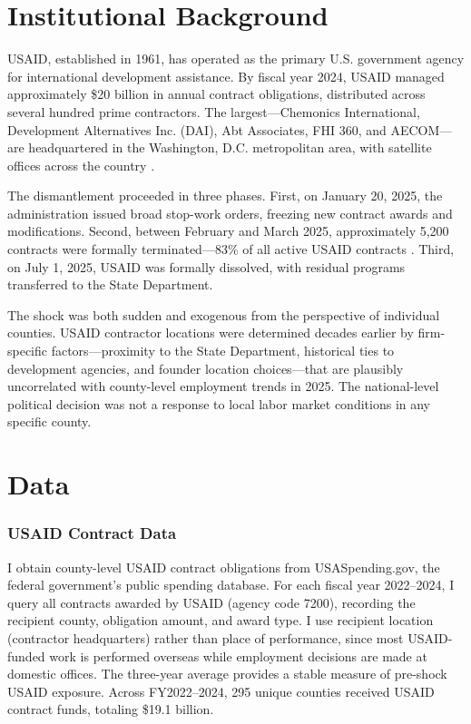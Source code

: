\documentclass[12pt]{article}
\begin{document}
\section{Institutional Background}
\label{sec:background}

USAID, established in 1961, has operated as the primary U.S. government agency for international development assistance. By fiscal year 2024, USAID managed approximately \$20 billion in annual contract obligations, distributed across several hundred prime contractors. The largest---Chemonics International, Development Alternatives Inc. (DAI), Abt Associates, FHI 360, and AECOM---are headquartered in the Washington, D.C. metropolitan area, with satellite offices across the country \citep{ingram2024usaid}.

The dismantlement proceeded in three phases. First, on January 20, 2025, the administration issued broad stop-work orders, freezing new contract awards and modifications. Second, between February and March 2025, approximately 5,200 contracts were formally terminated---83\% of all active USAID contracts \citep{runde2025}. Third, on July 1, 2025, USAID was formally dissolved, with residual programs transferred to the State Department.

The shock was both sudden and exogenous from the perspective of individual counties. USAID contractor locations were determined decades earlier by firm-specific factors---proximity to the State Department, historical ties to development agencies, and founder location choices---that are plausibly uncorrelated with county-level employment trends in 2025. The national-level political decision was not a response to local labor market conditions in any specific county.

\section{Data}
\label{sec:data}

\subsubsection*{USAID Contract Data} I obtain county-level USAID contract obligations from USASpending.gov, the federal government's public spending database. For each fiscal year 2022--2024, I query all contracts awarded by USAID (agency code 7200), recording the recipient county, obligation amount, and award type. I use recipient location (contractor headquarters) rather than place of performance, since most USAID-funded work is performed overseas while employment decisions are made at domestic offices. The three-year average provides a stable measure of pre-shock USAID exposure. Across FY2022--2024, 295 unique counties received USAID contract funds, totaling \$19.1 billion.
\end{document}
